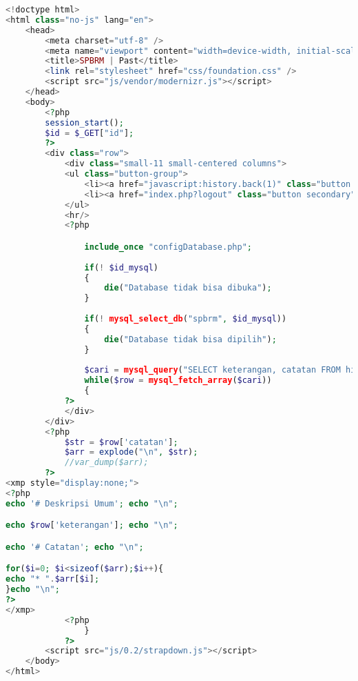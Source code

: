 \begin{lstlisting}[language=php,basicstyle=\tiny,caption=past.php]
<!doctype html>
<html class="no-js" lang="en">
	<head>
		<meta charset="utf-8" />
		<meta name="viewport" content="width=device-width, initial-scale=1.0" />
		<title>SPBRM | Past</title>
		<link rel="stylesheet" href="css/foundation.css" />
		<script src="js/vendor/modernizr.js"></script>
	</head>
	<body>
		<?php
		session_start();
		$id = $_GET["id"];
		?>
		<div class="row">
			<div class="small-11 small-centered columns">
			<ul class="button-group">
				<li><a href="javascript:history.back(1)" class="button secondary">Kembali</a></li>
				<li><a href="index.php?logout" class="button secondary">Logout</a></li>
			</ul>
			<hr/>
			<?php

				include_once "configDatabase.php";
				
				if(! $id_mysql)
				{
					die("Database tidak bisa dibuka");
				}
					
				if(! mysql_select_db("spbrm", $id_mysql))
				{
					die("Database tidak bisa dipilih");
				}
				
				$cari = mysql_query("SELECT keterangan, catatan FROM histori WHERE id_histori='$id'", $id_mysql);
				while($row = mysql_fetch_array($cari))
				{
			?>
			</div>
		</div>
		<?php
			$str = $row['catatan'];
			$arr = explode("\n", $str);
			//var_dump($arr);
		?>
<xmp style="display:none;">
<?php
echo '# Deskripsi Umum'; echo "\n";

echo $row['keterangan']; echo "\n";

echo '# Catatan'; echo "\n";

for($i=0; $i<sizeof($arr);$i++){
echo "* ".$arr[$i]; 
}echo "\n";
?>
</xmp>
			<?php
				}
			?>
		<script src="js/0.2/strapdown.js"></script>
	</body>
</html>
\end{lstlisting}

